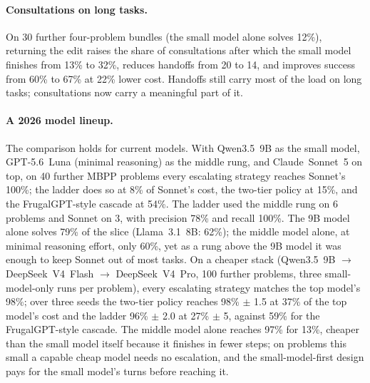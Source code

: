 \paragraph{Consultations on long tasks.}
On 30 further four-problem bundles (the small model alone solves 12\%), returning the edit raises the share of consultations after which the small model finishes from 13\% to 32\%, reduces handoffs from 20 to 14, and improves success from 60\% to 67\% at 22\% lower cost.
Handoffs still carry most of the load on long tasks; consultations now carry a meaningful part of it.

\paragraph{A 2026 model lineup.}
The comparison holds for current models.
With Qwen3.5~9B as the small model, GPT-5.6~Luna (minimal reasoning) as the middle rung, and Claude~Sonnet~5 on top, on 40 further MBPP problems every escalating strategy reaches Sonnet's 100\%; the ladder does so at 8\% of Sonnet's cost, the two-tier policy at 15\%, and the FrugalGPT-style cascade at 54\%.
The ladder used the middle rung on 6 problems and Sonnet on 3, with precision 78\% and recall 100\%.
The 9B model alone solves 79\% of the slice (Llama~3.1~8B: 62\%); the middle model alone, at minimal reasoning effort, only 60\%, yet as a rung above the 9B model it was enough to keep Sonnet out of most tasks.
On a cheaper stack (Qwen3.5~9B $\rightarrow$ DeepSeek~V4~Flash $\rightarrow$ DeepSeek~V4~Pro, 100 further problems, three small-model-only runs per problem), every escalating strategy matches the top model's 98\%; over three seeds the two-tier policy reaches 98\% $\pm$ 1.5 at 37\% of the top model's cost and the ladder 96\% $\pm$ 2.0 at 27\% $\pm$ 5, against 59\% for the FrugalGPT-style cascade.
The middle model alone reaches 97\% for 13\%, cheaper than the small model itself because it finishes in fewer steps; on problems this small a capable cheap model needs no escalation, and the small-model-first design pays for the small model's turns before reaching it.

